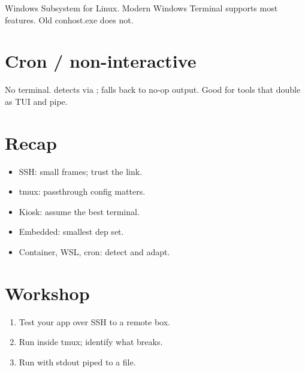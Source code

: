 Windows Subsystem for Linux. Modern Windows Terminal
supports most features. Old conhost.exe does not.

\section{Cron / non-interactive}

No terminal. \maya{} detects via ; falls
back to no-op output. Good for tools that double as TUI
and pipe.

\section{Recap}

\begin{recap}
\begin{itemize}[leftmargin=*]
  \item SSH: small frames; trust the link.
  \item tmux: passthrough config matters.
  \item Kiosk: assume the best terminal.
  \item Embedded: smallest dep set.
  \item Container, WSL, cron: detect and adapt.
\end{itemize}
\end{recap}

\section*{Workshop}

\begin{enumerate}[leftmargin=*]
  \item Test your app over SSH to a remote box.
  \item Run inside tmux; identify what breaks.
  \item Run with stdout piped to a file.
\end{enumerate}
